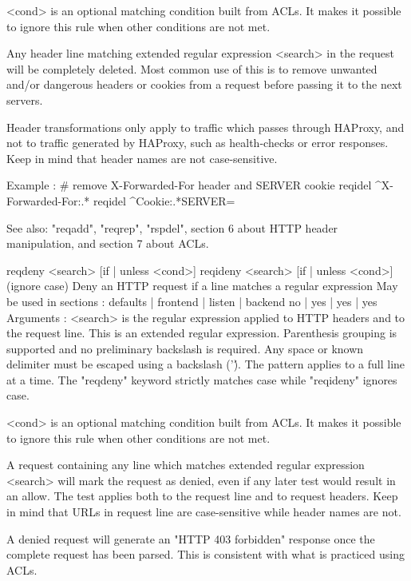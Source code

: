     <cond>    is an optional matching condition built from ACLs. It makes it
              possible to ignore this rule when other conditions are not met.

  Any header line matching extended regular expression <search> in the request
  will be completely deleted. Most common use of this is to remove unwanted
  and/or dangerous headers or cookies from a request before passing it to the
  next servers.

  Header transformations only apply to traffic which passes through HAProxy,
  and not to traffic generated by HAProxy, such as health-checks or error
  responses. Keep in mind that header names are not case-sensitive.

  Example :
     # remove X-Forwarded-For header and SERVER cookie
     reqidel ^X-Forwarded-For:.*
     reqidel ^Cookie:.*SERVER=

  See also: "reqadd", "reqrep", "rspdel", section 6 about HTTP header
            manipulation, and section 7 about ACLs.


reqdeny  <search> [{if | unless} <cond>]
reqideny <search> [{if | unless} <cond>]  (ignore case)
  Deny an HTTP request if a line matches a regular expression
  May be used in sections :   defaults | frontend | listen | backend
                                 no    |    yes   |   yes  |   yes
  Arguments :
    <search>  is the regular expression applied to HTTP headers and to the
              request line. This is an extended regular expression. Parenthesis
              grouping is supported and no preliminary backslash is required.
              Any space or known delimiter must be escaped using a backslash
              ('\'). The pattern applies to a full line at a time. The
              "reqdeny" keyword strictly matches case while "reqideny" ignores
              case.

    <cond>    is an optional matching condition built from ACLs. It makes it
              possible to ignore this rule when other conditions are not met.

  A request containing any line which matches extended regular expression
  <search> will mark the request as denied, even if any later test would
  result in an allow. The test applies both to the request line and to request
  headers. Keep in mind that URLs in request line are case-sensitive while
  header names are not.

  A denied request will generate an "HTTP 403 forbidden" response once the
  complete request has been parsed. This is consistent with what is practiced
  using ACLs.

